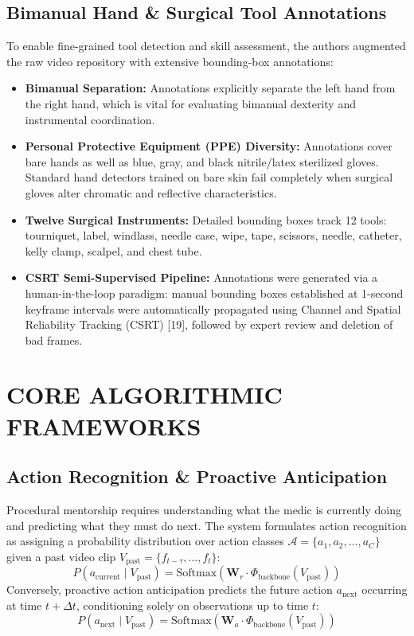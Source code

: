 \documentclass[12pt,a4paper]{report}
\begin{document}
\subsection{Bimanual Hand \& Surgical Tool Annotations}
To enable fine-grained tool detection and skill assessment, the authors augmented the raw video repository with extensive bounding-box annotations:
\begin{itemize}
    \item \textbf{Bimanual Separation:} Annotations explicitly separate the left hand from the right hand, which is vital for evaluating bimanual dexterity and instrumental coordination.
    \item \textbf{Personal Protective Equipment (PPE) Diversity:} Annotations cover bare hands as well as blue, gray, and black nitrile/latex sterilized gloves. Standard hand detectors trained on bare skin fail completely when surgical gloves alter chromatic and reflective characteristics.
    \item \textbf{Twelve Surgical Instruments:} Detailed bounding boxes track 12 tools: tourniquet, label, windlass, needle case, wipe, tape, scissors, needle, catheter, kelly clamp, scalpel, and chest tube.
    \item \textbf{CSRT Semi-Supervised Pipeline:} Annotations were generated via a human-in-the-loop paradigm: manual bounding boxes established at 1-second keyframe intervals were automatically propagated using Channel and Spatial Reliability Tracking (CSRT) [19], followed by expert review and deletion of bad frames.
\end{itemize}

\section{CORE ALGORITHMIC FRAMEWORKS}

\subsection{Action Recognition \& Proactive Anticipation}
Procedural mentorship requires understanding what the medic is currently doing and predicting what they must do next. The system formulates action recognition as assigning a probability distribution over action classes $\mathcal{A} = \{a_1, a_2, \dots, a_C\}$ given a past video clip $V_{\text{past}} = \{f_{t-\tau}, \dots, f_t\}$:
\begin{equation}
    P(a_{\text{current}} \mid V_{\text{past}}) = \text{Softmax}(\mathbf{W}_r \cdot \Phi_{\text{backbone}}(V_{\text{past}}))
\end{equation}
Conversely, proactive action anticipation predicts the future action $a_{\text{next}}$ occurring at time $t + \Delta t$, conditioning solely on observations up to time $t$:
\begin{equation}
    P(a_{\text{next}} \mid V_{\text{past}}) = \text{Softmax}(\mathbf{W}_a \cdot \Phi_{\text{backbone}}(V_{\text{past}}))
\end{equation}
\end{document}
